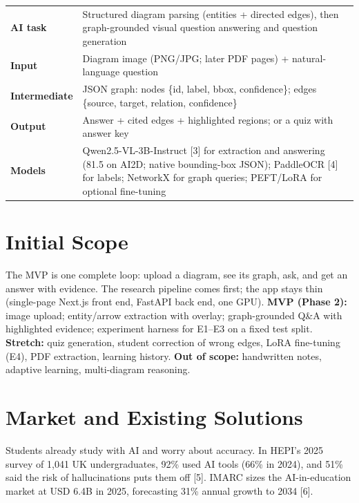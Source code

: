 \documentclass[11pt,letterpaper]{article}
\begin{document}
{\small
\begin{tabularx}{\textwidth}{@{}P{2.6cm}L@{}}
\toprule
\textbf{AI task} & Structured diagram parsing (entities + directed edges), then graph-grounded visual question answering and question generation \\
\textbf{Input} & Diagram image (PNG/JPG; later PDF pages) + natural-language question \\
\textbf{Intermediate} & JSON graph: nodes \{id, label, bbox, confidence\}; edges \{source, target, relation, confidence\} \\
\textbf{Output} & Answer + cited edges + highlighted regions; or a quiz with answer key \\
\textbf{Models} & Qwen2.5-VL-3B-Instruct [3] for extraction and answering (81.5 on AI2D; native bounding-box JSON); PaddleOCR [4] for labels; NetworkX for graph queries; PEFT/LoRA for optional fine-tuning \\
\bottomrule
\end{tabularx}}

\section{Initial Scope}
The MVP is one complete loop: upload a diagram, see its graph, ask, and get an answer with evidence. The research pipeline comes first; the app stays thin (single-page Next.js front end, FastAPI back end, one GPU).
\textbf{MVP (Phase 2):} image upload; entity/arrow extraction with overlay; graph-grounded Q\&A with highlighted evidence; experiment harness for E1--E3 on a fixed test split.
\textbf{Stretch:} quiz generation, student correction of wrong edges, LoRA fine-tuning (E4), PDF extraction, learning history.
\textbf{Out of scope:} handwritten notes, adaptive learning, multi-diagram reasoning.

\section{Market and Existing Solutions}
Students already study with AI and worry about accuracy. In HEPI's 2025 survey of 1,041 UK undergraduates, 92\% used AI tools (66\% in 2024), and 51\% said the risk of hallucinations puts them off [5]. IMARC sizes the AI-in-education market at USD 6.4B in 2025, forecasting 31\% annual growth to 2034 [6].
\end{document}
